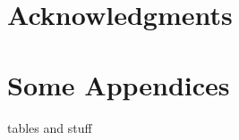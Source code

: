\documentclass{sig-alternate-05-2015}
\newcommand{\todo}{\textbf{TODO:} \textbf}
\begin{document}
\section{Acknowledgments}

%

%
%
\newpage
\onecolumn
\appendix

\section{Some Appendices}
tables and stuff
\end{document}
